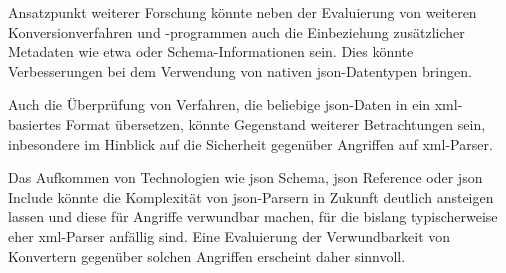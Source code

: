 Ansatzpunkt weiterer Forschung könnte neben der Evaluierung von weiteren Konversionverfahren und -programmen auch die Einbeziehung zusätzlicher Metadaten wie etwa  oder Schema-Informationen sein. Dies könnte Verbesserungen bei dem Verwendung von nativen \acrshort{json}-Datentypen bringen.

Auch die Überprüfung von Verfahren, die beliebige \acrshort{json}-Daten in ein \acrshort{xml}-basiertes Format übersetzen, könnte Gegenstand weiterer Betrachtungen sein, inbesondere im Hinblick auf die Sicherheit gegenüber Angriffen auf \acrshort{xml}-Parser.

Das Aufkommen von Technologien wie \acrshort{json} Schema, \acrshort{json} Reference oder \acrshort{json} Include könnte die Komplexität von \acrshort{json}-Parsern in Zukunft deutlich ansteigen lassen und diese für Angriffe verwundbar machen, für die bislang typischerweise eher \acrshort{xml}-Parser anfällig sind. Eine Evaluierung der Verwundbarkeit von Konvertern gegenüber solchen Angriffen erscheint daher sinnvoll.
